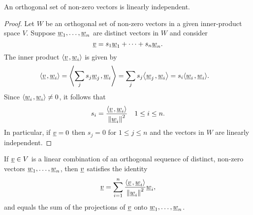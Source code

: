 \begin{theorem}
An orthogonal set of non-zero vectors is linearly independent.
\end{theorem}
\begin{proof}
Let $W$ be an orthogonal set of non-zero vectors in a given inner-product space $V$.
Suppose $\underline{w}_1, \ldots, \underline{w}_n$ are distinct vectors in $W$ and consider
\begin{equation*}
\underline{v} = s_1 \underline{w}_1 + \cdots + s_n \underline{w}_n.
\end{equation*}
The inner product ${\left\langle  \underline{v}  \mskip2mu ,  \underline{w}_i  \right\rangle}$ is given by
\begin{equation*}
\begin{split}
{\left\langle  \underline{v}  \mskip2mu ,  \underline{w}_i  \right\rangle}
&= {\left\langle  \sum_j s_j \underline{w}_j  \mskip2mu ,  \underline{w}_i  \right\rangle}
= \sum_j s_j {\left\langle  \underline{w}_j  \mskip2mu ,  \underline{w}_i  \right\rangle}
= s_i {\left\langle  \underline{w}_i  \mskip2mu ,  \underline{w}_i  \right\rangle} .
\end{split}
\end{equation*}
Since ${\left\langle  \underline{w}_i  \mskip2mu ,  \underline{w}_i  \right\rangle} \neq 0$, it follows that
\begin{equation*}
s_i = \frac{ {\left\langle  \underline{v}  \mskip2mu ,  \underline{w}_i  \right\rangle} }
{ \left\| \underline{w}_i \right\|^2 }
\quad 1 \leq i \leq n.
\end{equation*}
In particular, if $\underline{v} = 0$ then $s_j = 0$ for $1 \leq j \leq n$ and the vectors in $W$ are linearly independent.
\end{proof}

\begin{corollary}
If $\underline{v} \in V$ is a linear combination of an orthogonal sequence of distinct, non-zero vectors $\underline{w}_1, \ldots, \underline{w}_n$, then $\underline{v}$ satisfies the identity
\begin{equation*}
\underline{v} = \sum_{i = 1}^n \frac{ {\left\langle  \underline{v}  \mskip2mu ,  \underline{w}_i  \right\rangle} } { \left\| \underline{w}_i \right\|^2 } \underline{w}_i,
\end{equation*}
and equals the sum of the projections of $\underline{v}$ onto $\underline{w}_1, \ldots, \underline{w}_n$.
\end{corollary}

